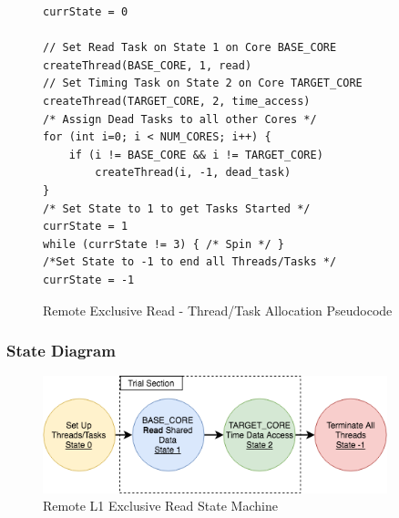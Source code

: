 \documentclass[bsc,frontabs,twoside,singlespacing,parskip,deptreport]{infthesis}     %
\begin{document}
\begin{figure}[!h]
    \centering
    \begin{minipage}{0.7\textwidth}
    \begin{verbatim}
currState = 0

// Set Read Task on State 1 on Core BASE_CORE
createThread(BASE_CORE, 1, read)
// Set Timing Task on State 2 on Core TARGET_CORE
createThread(TARGET_CORE, 2, time_access)
/* Assign Dead Tasks to all other Cores */
for (int i=0; i < NUM_CORES; i++) {
    if (i != BASE_CORE && i != TARGET_CORE)
        createThread(i, -1, dead_task)
}
/* Set State to 1 to get Tasks Started */
currState = 1
while (currState != 3) { /* Spin */ }
/*Set State to -1 to end all Threads/Tasks */
currState = -1
    \end{verbatim}
    \end{minipage}
    \caption{Remote Exclusive Read - Thread/Task Allocation Pseudocode}
    \label{fig:remote-E-read-pseudo}
\end{figure}


\subsubsection{State Diagram}
\begin{figure}[!h]
    \centering
    \includegraphics[width=100mm]{ExclusiveState.png}
    \caption{Remote L1 Exclusive Read State Machine}
    \label{fig:remote-E-read-state}
\end{figure}
\end{document}
